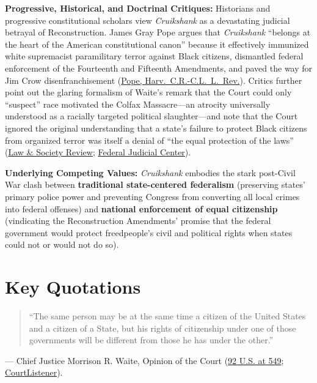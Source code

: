 \documentclass[12pt]{article}
\begin{document}
\textbf{Progressive, Historical, and Doctrinal Critiques:} Historians and progressive constitutional scholars view \textit{Cruikshank} as a devastating judicial betrayal of Reconstruction. James Gray Pope argues that \textit{Cruikshank} ``belongs at the heart of the American constitutional canon'' because it effectively immunized white supremacist paramilitary terror against Black citizens, dismantled federal enforcement of the Fourteenth and Fifteenth Amendments, and paved the way for Jim Crow disenfranchisement (\href{https://journals.law.harvard.edu/crcl/wp-content/uploads/sites/80/2011/09/385_Pope.pdf}{Pope, Harv.~C.R.-C.L.~L.~Rev.}). Critics further point out the glaring formalism of Waite's remark that the Court could only ``suspect'' race motivated the Colfax Massacre---an atrocity universally understood as a racially targeted political slaughter---and note that the Court ignored the original understanding that a state's failure to protect Black citizens from organized terror was itself a denial of ``the equal protection of the laws'' (\href{https://www.cambridge.org/core/journals/law-and-society-review/article/judicial-abandonment-of-blacks-rethinking-the-state-action-cases-of-the-waite-court/6EFE4577A05FAA2791AB1541BFBFC371}{Law \& Society Review}; \href{https://www.fjc.gov/history/exhibits/circuit-court-opinions/United-States-v-Cruikshank}{Federal Judicial Center}).

\textbf{Underlying Competing Values:} \textit{Cruikshank} embodies the stark post-Civil War clash between \textbf{traditional state-centered federalism} (preserving states' primary police power and preventing Congress from converting all local crimes into federal offenses) and \textbf{national enforcement of equal citizenship} (vindicating the Reconstruction Amendments' promise that the federal government would protect freedpeople's civil and political rights when states could not or would not do so).

\section{Key Quotations}

\begin{quote}
``The same person may be at the same time a citizen of the United States and a citizen of a State, but his rights of citizenship under one of those governments will be different from those he has under the other.''
\end{quote}
\noindent --- Chief Justice Morrison R. Waite, Opinion of the Court (\href{https://supreme.justia.com/cases/federal/us/92/542/}{92 U.S. at 549}; \href{https://www.courtlistener.com/opinion/89309/united-states-v-cruikshank/}{CourtListener}).
\end{document}
